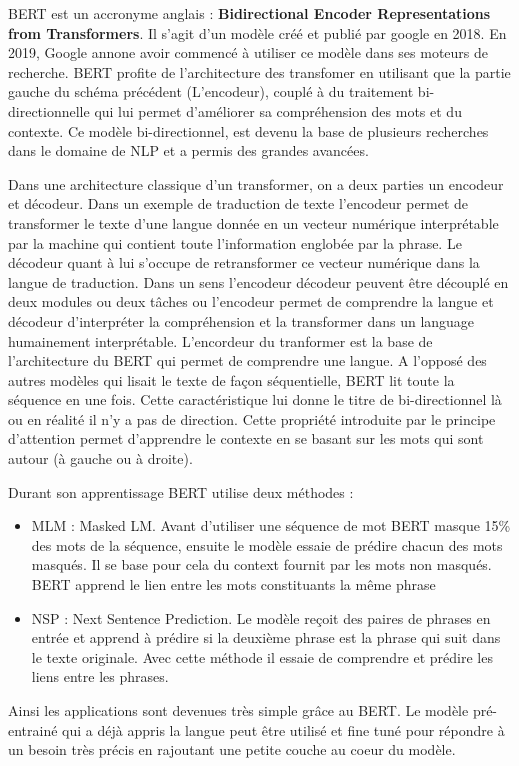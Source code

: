 \documentclass[8pt]{article}
\begin{document}
    BERT est un accronyme anglais : \textbf{Bidirectional Encoder
Representations from Transformers}. Il s'agit d'un modèle créé et publié
par google en 2018. En 2019, Google annone avoir commencé à utiliser ce
modèle dans ses moteurs de recherche. BERT profite de l'architecture des
transfomer en utilisant que la partie gauche du schéma précédent
(L'encodeur), couplé à du traitement bi-directionnelle qui lui permet
d'améliorer sa compréhension des mots et du contexte. Ce modèle
bi-directionnel, est devenu la base de plusieurs recherches dans le
domaine de NLP et a permis des grandes avancées.

    Dans une architecture classique d'un transformer, on a deux parties un
encodeur et décodeur. Dans un exemple de traduction de texte l'encodeur
permet de transformer le texte d'une langue donnée en un vecteur
numérique interprétable par la machine qui contient toute l'information
englobée par la phrase. Le décodeur quant à lui s'occupe de
retransformer ce vecteur numérique dans la langue de traduction. Dans un
sens l'encodeur décodeur peuvent être découplé en deux modules ou deux
tâches ou l'encodeur permet de comprendre la langue et décodeur
d'interpréter la compréhension et la transformer dans un language
humainement interprétable. L'encordeur du tranformer est la base de
l'architecture du BERT qui permet de comprendre une langue. A l'opposé
des autres modèles qui lisait le texte de façon séquentielle, BERT lit
toute la séquence en une fois. Cette caractéristique lui donne le titre
de bi-directionnel là ou en réalité il n'y a pas de direction. Cette
propriété introduite par le principe d'attention permet d'apprendre le
contexte en se basant sur les mots qui sont autour (à gauche ou à
droite).

    Durant son apprentissage BERT utilise deux méthodes : 
\begin{itemize}
\item  MLM : Masked LM.
Avant d'utiliser une séquence de mot BERT masque 15\% des mots de la
séquence, ensuite le modèle essaie de prédire chacun des mots masqués.
Il se base pour cela du context fournit par les mots non masqués. BERT
apprend le lien entre les mots constituants la même phrase
\item  NSP : Next Sentence Prediction. Le modèle reçoit des paires de phrases en entrée et
apprend à prédire si la deuxième phrase est la phrase qui suit dans le
texte originale. Avec cette méthode il essaie de comprendre et prédire
les liens entre les phrases.
\end{itemize}
    Ainsi les applications sont devenues très simple grâce au BERT. Le
modèle pré-entrainé qui a déjà appris la langue peut être utilisé et
fine tuné pour répondre à un besoin très précis en rajoutant une petite
couche au coeur du modèle.
\end{document}
